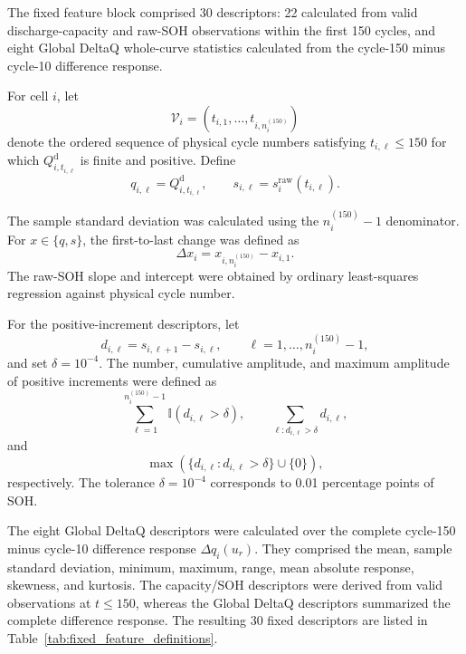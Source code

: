 \documentclass[pdflatex,sn-mathphys-num]{sn-jnl}
\begin{document}
The fixed feature block comprised 30 descriptors: 22 calculated from valid discharge-capacity and raw-SOH observations within the first 150 cycles, and eight Global DeltaQ whole-curve statistics calculated from the cycle-150 minus cycle-10 difference response.

For cell $i$, let
\[
\mathcal{V}_i
=
\left(
t_{i,1},
\ldots,
t_{i,n_i^{(150)}}
\right)
\]
denote the ordered sequence of physical cycle numbers satisfying $t_{i,\ell}\leq150$ for which $Q_{i,t_{i,\ell}}^{\mathrm d}$ is finite and positive. Define
\[
q_{i,\ell}
=
Q_{i,t_{i,\ell}}^{\mathrm d},
\qquad
s_{i,\ell}
=
s_i^{\mathrm{raw}}(t_{i,\ell}).
\]

The sample standard deviation was calculated using the $n_i^{(150)}-1$ denominator. For $x\in\{q,s\}$, the first-to-last change was defined as
\[
\Delta x_i
=
x_{i,n_i^{(150)}}-x_{i,1}.
\]
The raw-SOH slope and intercept were obtained by ordinary least-squares regression against physical cycle number.

For the positive-increment descriptors, let
\[
d_{i,\ell}
=
s_{i,\ell+1}-s_{i,\ell},
\qquad
\ell=1,\ldots,n_i^{(150)}-1,
\]
and set $\delta=10^{-4}$. The number, cumulative amplitude, and maximum amplitude of positive increments were defined as
\[
\sum_{\ell=1}^{n_i^{(150)}-1}
\mathbb{I}(d_{i,\ell}>\delta),
\qquad
\sum_{\ell:d_{i,\ell}>\delta}d_{i,\ell},
\]
and
\[
\max\left(
\{d_{i,\ell}:d_{i,\ell}>\delta\}
\cup
\{0\}
\right),
\]
respectively. The tolerance $\delta=10^{-4}$ corresponds to 0.01 percentage points of SOH.

The eight Global DeltaQ descriptors were calculated over the complete cycle-150 minus cycle-10 difference response $\Delta q_i(u_r)$. They comprised the mean, sample standard deviation, minimum, maximum, range, mean absolute response, skewness, and kurtosis. The capacity/SOH descriptors were derived from valid observations at $t\leq150$, whereas the Global DeltaQ descriptors summarized the complete difference response. The resulting 30 fixed descriptors are listed in Table~\ref{tab:fixed_feature_definitions}.
\end{document}
